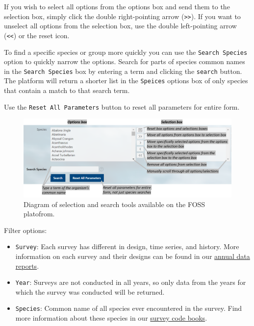 \documentclass[
  letterpaper,
  oneside,
  open=any]{scrbook}
\providecommand{\tightlist}{%
  \setlength{\itemsep}{0pt}\setlength{\parskip}{0pt}}\usepackage{longtable,booktabs,array}
\begin{document}
If you wish to select all options from the options box and send them to
the selection box, simply click the double right-pointing arrow
(\texttt{\textgreater{}\textgreater{}}). If you want to unselect all
options from the selection box, use the double left-pointing arrow
(\texttt{\textless{}\textless{}}) or the reset icon.

To find a specific species or group more quickly you can use the
\texttt{Search\ Species} option to quickly narrow the options. Search
for parts of species common names in the \texttt{Search\ Species} box by
entering a term and clicking the \texttt{search} button. The platform
will return a shorter list in the \texttt{Speices} options box of only
species that contain a match to that search term.

Use the \texttt{Reset\ All\ Parameters} button to reset all parameters
for entire form.

\begin{figure}

{\centering \includegraphics[width=6.67in,height=\textheight]{content/../img/foss_2_select.png}

}

\caption{Diagram of selection and search tools available on the FOSS
platofrom.}

\end{figure}

Filter options:

\begin{itemize}
\tightlist
\item
  \texttt{Survey}: Each survey has different in design, time series, and
  history. More information on each survey and their designs can be
  found in our
  \href{https://www.fisheries.noaa.gov/alaska/science-data/groundfish-assessment-program-bottom-trawl-surveys\#data-products}{annual
  data reports}.
\item
  \texttt{Year}: Surveys are not conducted in all years, so only data
  from the years for which the survey was conducted will be returned.
\item
  \texttt{Species}: Common name of all species ever encountered in the
  survey. Find more information about these species in our
  \href{https://www.fisheries.noaa.gov/resource/document/groundfish-survey-species-code-manual-and-data-codes-manual}{survey
  code books}.
\end{itemize}
\end{document}
